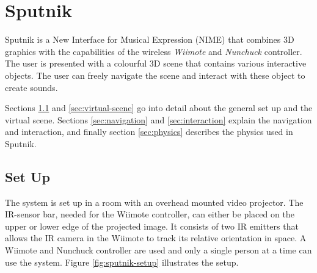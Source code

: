 \documentclass[10pt,a4paper]{scrartcl}
\begin{document}















\section{Sputnik}
\label{sec:sputnik}
Sputnik is a New Interface for Musical Expression (NIME) that combines 3D graphics with the capabilities of the wireless \emph{Wiimote} and \emph{Nunchuck} controller. The user is presented with a colourful 3D scene that contains various interactive objects. The user can freely navigate the scene and interact with these object to create sounds.

Sections \ref{sec:setup} and \ref{sec:virtual-scene} go into detail about the general set up and the virtual scene. Sections \ref{sec:navigation} and \ref{sec:interaction} explain the navigation and interaction, and finally section \ref{sec:physics} describes the physics used in Sputnik.

\subsection{Set Up}
\label{sec:setup}
The system is set up in a room with an overhead mounted video projector. The IR-sensor bar, needed for the Wiimote controller, can either be placed on the upper or lower edge of the projected image. It consists of two IR emitters that allows the IR camera in the Wiimote to track its relative orientation in space. A Wiimote and Nunchuck controller are used and only a single person at a time can use the system. Figure \ref{fig:sputnik-setup} illustrates the setup.
\end{document}

